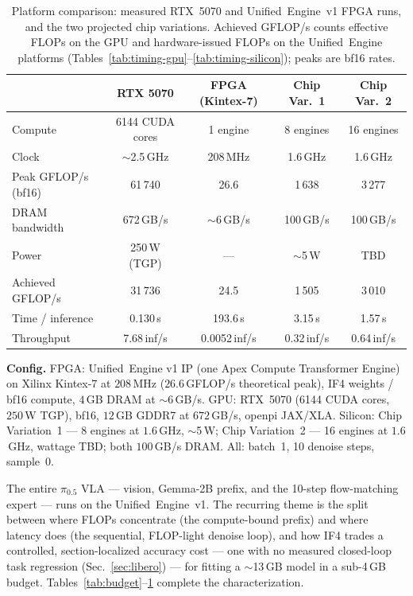 \documentclass[11pt]{article}
\newcommand{\pizero}{$\pi_{0.5}$}
\newcommand{\ue}{Unified~Engine}
\newcommand{\iffour}{IF4}
\newcommand{\bfteen}{bf16}
\begin{document}
\begin{table}[H]
\centering\small
\caption{Platform comparison: measured RTX~5070 and \ue{}~v1 FPGA runs, and
the two projected chip variations. Achieved GFLOP/s counts effective FLOPs
on the GPU and hardware-issued FLOPs on the \ue{} platforms
(Tables~\ref{tab:timing-gpu}--\ref{tab:timing-silicon}); peaks are \bfteen{}
rates.}
\label{tab:platforms}
\setlength{\tabcolsep}{4pt}
\begin{tabular}{@{}lcccc@{}}
\toprule
& \textbf{RTX 5070} & \textbf{FPGA (Kintex-7)} & \textbf{Chip Var.~1} & \textbf{Chip Var.~2} \\
\midrule
Compute            & 6144 CUDA cores & 1 engine & 8 engines & 16 engines \\
Clock              & $\sim$2.5\,GHz & 208\,MHz & 1.6\,GHz & 1.6\,GHz \\
Peak GFLOP/s (\bfteen{}) & 61\,740 & 26.6 & 1\,638 & 3\,277 \\
DRAM bandwidth     & 672\,GB/s & $\sim$6\,GB/s & 100\,GB/s & 100\,GB/s \\
Power              & 250\,W (TGP) & --- & $\sim$5\,W & TBD \\
Achieved GFLOP/s   & 31\,736 & 24.5 & 1\,505 & 3\,010 \\
Time / inference   & 0.130\,s & 193.6\,s & 3.15\,s & 1.57\,s \\
Throughput         & 7.68\,inf/s & 0.0052\,inf/s & 0.32\,inf/s & 0.64\,inf/s \\
\bottomrule
\end{tabular}
\end{table}

\vspace{2pt}
\noindent\textbf{Config.} FPGA: \ue{} v1 IP (one Apex Compute Transformer
Engine) on Xilinx Kintex-7 at $208$\,MHz
($26.6$\,GFLOP/s theoretical peak), \iffour{}
weights / \bfteen{} compute, $4$\,GB DRAM at $\sim$6\,GB/s. GPU: RTX~5070
(6144 CUDA cores, $250$\,W TGP), \bfteen{}, $12$\,GB GDDR7 at $672$\,GB/s,
openpi JAX/XLA. Silicon: Chip Variation~1 --- 8 engines at $1.6$\,GHz,
$\sim$5\,W; Chip Variation~2 --- 16 engines at $1.6$\,GHz, wattage TBD; both
$100$\,GB/s DRAM. All: batch~1, 10 denoise steps, sample~0.

\vspace{4pt}
The entire \pizero{} VLA --- vision, Gemma-2B prefix, and the 10-step
flow-matching expert --- runs on the \ue{}~v1. The recurring theme is the split
between where FLOPs concentrate (the compute-bound prefix) and where latency
does (the sequential, FLOP-light denoise loop), and how \iffour{} trades a
controlled, section-localized accuracy cost --- one with no measured
closed-loop task regression (Sec.~\ref{sec:libero}) --- for fitting a
$\sim$13\,GB model in a sub-4\,GB budget. Tables~\ref{tab:budget}--\ref{tab:platforms} complete
the characterization.
\end{document}
